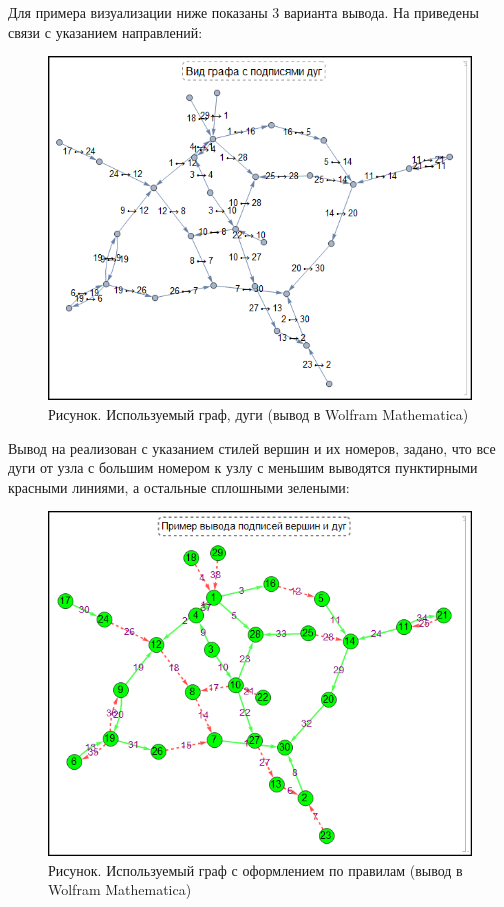Для примера визуализации ниже показаны 3 варианта вывода. На \textit{} приведены связи с указанием направлений:
\begin{figure}[H]
	\includegraphics[scale=0.68]{images/part7/chapter_integration/integr_alg32.png}
	\caption{Рисунок. Используемый граф, дуги (вывод в Wolfram Mathematica)}
	\label{fig:integr_alg32}
\end{figure}

Вывод на \textit{} реализован с указанием стилей вершин и их номеров, задано, что все дуги от узла с большим номером к узлу с меньшим выводятся пунктирными красными линиями, а остальные сплошными зелеными:

\begin{figure}[H]
	\includegraphics[scale=0.88]{images/part7/chapter_integration/integr_alg33.png}
	\caption{Рисунок. Используемый граф с оформлением по правилам (вывод в Wolfram Mathematica)}
	\label{fig:integr_alg33}
\end{figure}

